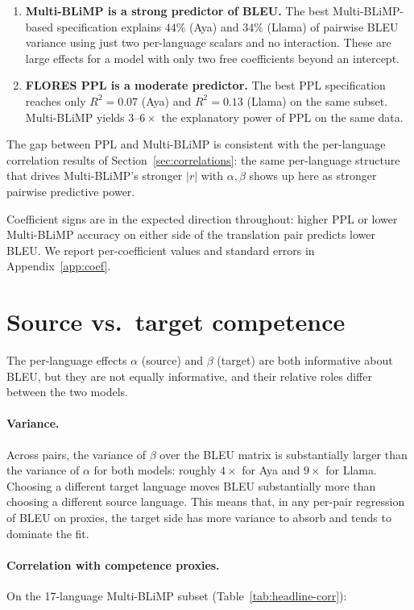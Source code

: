 \documentclass[11pt]{article}
\begin{document}
\begin{enumerate}
  \item \textbf{Multi-BLiMP is a strong predictor of BLEU.} The best
    Multi-BLiMP-based specification explains $44\%$ (Aya) and $34\%$
    (Llama) of pairwise BLEU variance using just two per-language
    scalars and no interaction. These are large effects for a model
    with only two free coefficients beyond an intercept.
  \item \textbf{FLORES PPL is a moderate predictor.} The best PPL
    specification reaches only $R^2 = 0.07$ (Aya) and $R^2 = 0.13$
    (Llama) on the same subset. Multi-BLiMP yields $3$--$6\times$ the
    explanatory power of PPL on the same data.
\end{enumerate}

The gap between PPL and Multi-BLiMP is consistent with the
per-language correlation results of Section~\ref{sec:correlations}:
the same per-language structure that drives Multi-BLiMP's stronger
$|r|$ with $\alpha, \beta$ shows up here as stronger pairwise
predictive power.

Coefficient signs are in the expected direction throughout: higher PPL
or lower Multi-BLiMP accuracy on either side of the translation pair
predicts lower BLEU. We report per-coefficient values and standard
errors in Appendix~\ref{app:coef}.

\section{Source vs.~target competence}
\label{sec:asymmetry}

The per-language effects $\alpha$ (source) and $\beta$ (target) are
both informative about BLEU, but they are not equally informative, and
their relative roles differ between the two models.

\paragraph{Variance.}
Across pairs, the variance of $\beta$ over the BLEU matrix is
substantially larger than the variance of $\alpha$ for both models:
roughly $4 \times$ for Aya and $9 \times$ for Llama. Choosing a
different target language moves BLEU substantially more than choosing
a different source language. This means that, in any per-pair
regression of BLEU on proxies, the target side has more variance to
absorb and tends to dominate the fit.

\paragraph{Correlation with competence proxies.}
On the 17-language Multi-BLiMP subset
(Table~\ref{tab:headline-corr}):
\end{document}
